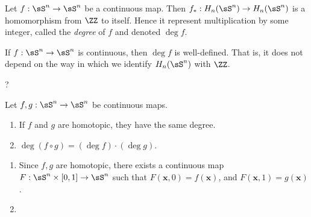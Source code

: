 \begin{definition}
  Let $f : \sS^n \to \sS^n$ be a continuous map. Then $f_* :
  H_n(\sS^n) \to H_n(\sS^n)$ is a homomorphism from $\ZZ$ to itself.
  Hence it represent multiplication by some integer, called the
  \emph{degree} of $f$ and denoted $\deg f$.
\end{definition}
\begin{problem}[18.38]
  If $f : \sS^n \to \sS^n$ is continuous, then $\deg f$ is
  well-defined. That is, it does not depend on the way in which we
  identify $H_n(\sS^n)$ with $\ZZ$.
\end{problem}
\begin{solution}
  ?
\end{solution}
\begin{problem}[18.39]
  Let $f,g : \sS^n \to \sS^n$ be continuous maps.
  \begin{enumerate}
    \item If $f$ and $g$ are homotopic, they have the same degree.
    \item $\deg (f \circ g) = (\deg f) \cdot (\deg g)$.
  \end{enumerate}
\end{problem}
\begin{solution}
  \begin{enumerate}
    \item Since $f,g$ are homotopic, there exists a continuous map $F
      : \sS^n \times [0,1] \to \sS^n$ such that $F(\bm x, 0) = f(\bm
      x)$, and $F(\bm x, 1) = g(\bm x)$.
    \item
  \end{enumerate}
\end{solution}

